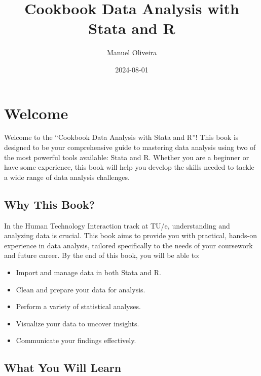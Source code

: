 \documentclass[
  letterpaper,
  DIV=11,
  numbers=noendperiod]{scrreprt}
\title{Cookbook Data Analysis with Stata and R}
\author{Manuel Oliveira}
\date{2024-08-01}
\providecommand{\tightlist}{%
  \setlength{\itemsep}{0pt}\setlength{\parskip}{0pt}}\usepackage{longtable,booktabs,array}
\renewcommand*\contentsname{Table of contents}
\newcommand\contentsname{Table of contents}
\begin{document}
\maketitle

\renewcommand*\contentsname{Table of contents}
{
\hypersetup{linkcolor=}
\setcounter{tocdepth}{2}
\tableofcontents
}

\chapter*{Welcome}\label{welcome}


Welcome to the ``Cookbook Data Analysis with Stata and R''! This book is
designed to be your comprehensive guide to mastering data analysis using
two of the most powerful tools available: Stata and R. Whether you are a
beginner or have some experience, this book will help you develop the
skills needed to tackle a wide range of data analysis challenges.

\section*{Why This Book?}\label{why-this-book}


In the Human Technology Interaction track at TU/e, understanding and
analyzing data is crucial. This book aims to provide you with practical,
hands-on experience in data analysis, tailored specifically to the needs
of your coursework and future career. By the end of this book, you will
be able to:

\begin{itemize}
\tightlist
\item
  Import and manage data in both Stata and R.
\item
  Clean and prepare your data for analysis.
\item
  Perform a variety of statistical analyses.
\item
  Visualize your data to uncover insights.
\item
  Communicate your findings effectively.
\end{itemize}

\section*{What You Will Learn}\label{what-you-will-learn}
\end{document}
